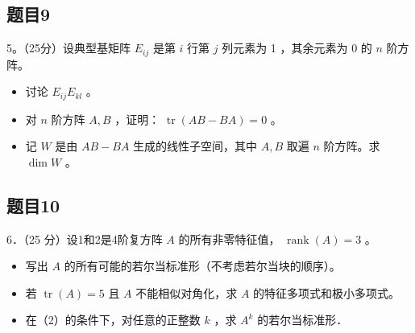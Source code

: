 \documentclass{article}
\begin{document}
\subsection{题目9}
5。（25分）设典型基矩阵 \(E_{i j}\) 是第 \(i\) 行第 \(j\) 列元素为 1 ，其余元素为 0 的 \(n\) 阶方阵。

\begin{itemize}
  \item[（1）] 讨论 \(E_{i j} E_{k l}\) 。
  \item[（2）] 对 \(n\) 阶方阵 \(A, B\) ，证明： \(\operatorname{tr}(A B-B A)=0\) 。
  \item[（3）] 记 \(W\) 是由 \(A B-B A\) 生成的线性子空间，其中 \(A, B\) 取遍 \(n\) 阶方阵。求 \(\operatorname{dim} W\) 。
\end{itemize}

\subsection{题目10}
6．（25 分）设1和2是4阶复方阵 \(A\) 的所有非零特征值， \(\operatorname{rank}(A)=3\) 。

\begin{itemize}
  \item[（1）] 写出 \(A\) 的所有可能的若尔当标准形（不考虑若尔当块的顺序）。
  \item[（2）] 若 \(\operatorname{tr}(A)=5\) 且 \(A\) 不能相似对角化，求 \(A\) 的特征多项式和极小多项式。
  \item[（3）] 在（2）的条件下，对任意的正整数 \(k\) ，求 \(A^{k}\) 的若尔当标准形．
\end{itemize}
\end{document}
